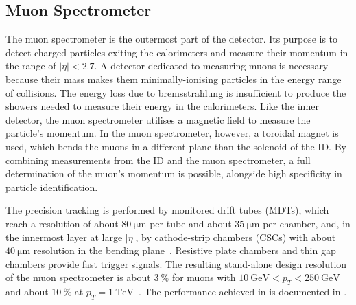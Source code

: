 \subsection{Muon Spectrometer}
The muon spectrometer is the outermost part of the \atlas detector. Its purpose is to detect charged particles exiting the calorimeters and measure their momentum in the range of $|\eta|<2.7$. A detector dedicated to measuring muons is necessary because their mass makes them minimally-ionising particles in the energy range of \lhc collisions. The energy loss due to bremsstrahlung is insufficient to produce the showers needed to measure their energy in the calorimeters. Like the inner detector, the muon spectrometer utilises a magnetic field to measure the particle's momentum. In the muon spectrometer, however, a toroidal magnet is used, which bends the muons in a different plane than the solenoid of the ID. By combining measurements from the ID and the muon spectrometer, a full determination of the muon's momentum is possible, alongside high specificity in particle identification.

The precision tracking is performed by monitored drift tubes (MDTs), which reach a resolution of about $\qty{80}{\micro\metre}$ per tube and about $\qty{35}{\micro\metre}$ per chamber, and, in the innermost layer at large $|\eta|$, by cathode-strip chambers (CSCs) with about $\qty{40}{\micro\metre}$ resolution in the bending plane~\cite{atlas_muon_tdr,atlas_jinst}. Resistive plate chambers and thin gap chambers provide fast trigger signals. The resulting stand-alone design resolution of the muon spectrometer is about $\qty{3}{\percent}$ for muons with $\qty{10}{\giga\electronvolt}<p_T<\qty{250}{\giga\electronvolt}$ and about $\qty{10}{\percent}$ at $p_T=\qty{1}{\tera\electronvolt}$~\cite{atlas_muon_tdr}. The performance achieved in \LHCrunii is documented in \cite{atlas_muon_run2}.

